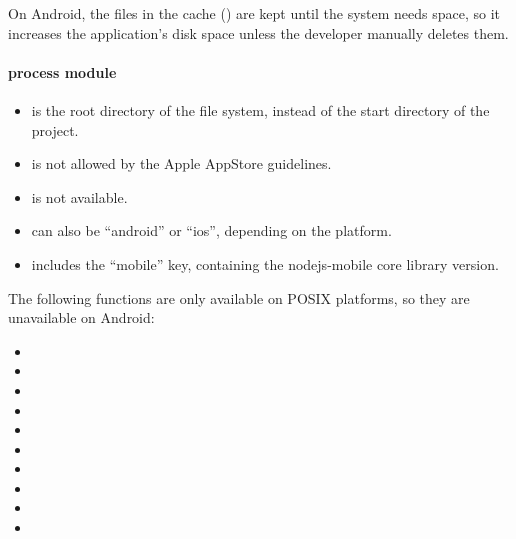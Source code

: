 On Android, the files in the cache () are kept until the system needs space, so it increases the application's disk space unless the developer manually deletes them.

\newpage

\paragraph{process module}

\begin{itemize}
  \setlength\itemsep{-0.5em}
  \item {} is the root directory of the file system, instead of the start directory of the project.
  \item {} is not allowed by the Apple AppStore guidelines.
  \item {} is not available.
  \item {} can also be \enquote{android} or \enquote{ios}, depending on the platform.
  \item {} includes the \enquote{mobile} key, containing the nodejs-mobile core library version.
\end{itemize}

The following functions are only available on POSIX platforms, so they are unavailable on Android:

\begin{itemize}
  \setlength\itemsep{-0.8em}
  \item {}
  \item {}
  \item {}
  \item {}
  \item {}
  \item {}
  \item {}
  \item {}
  \item {}
  \item {}
\end{itemize}
